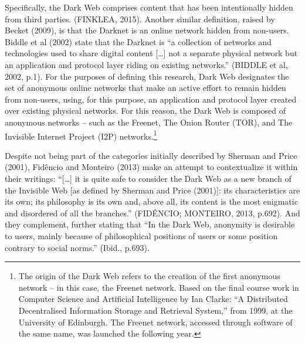 Specifically, the Dark Web comprises content that has been intentionally hidden from third parties. (FINKLEA, 2015). Another similar definition, raised by Becket (2009), is that the Darknet is an online network hidden from non-users. Biddle et al (2002) state that the Darknet is ``a collection of networks and technologies used to share digital content {[}\ldots{]} not a separate physical network but an application and protocol layer riding on existing networks.'' (BIDDLE et al, 2002, p.1). For the purposes of defining this research, Dark Web designates the set of anonymous online networks that make an active effort to remain hidden from non-users, using, for this purpose, an application and protocol layer created over existing physical networks. For this reason, the Dark Web is composed of anonymous networks -- such as the Freenet, The Onion Router (TOR), and The Invisible Internet Project (I2P) networks.\footnote{The origin of the Dark Web refers to the creation of the first anonymous network -- in this case, the Freenet network. Based on the final course work in Computer Science and Artificial Intelligence by Ian Clarke: ``A Distributed Decentralised Information Storage and Retrieval System,'' from 1999, at the University of Edinburgh. The Freenet network, accessed through software of the same name, was launched the following year.}

Despite not being part of the categories initially described by Sherman and Price (2001), Fid\^{e}ncio and Monteiro (2013) make an attempt to contextualize it within their writings: ``{[}\ldots{]} it is quite safe to consider the Dark Web as a new branch of the Invisible Web {[}as defined by Sherman and Price (2001){]}: its characteristics are its own; its philosophy is its own and, above all, its content is the most enigmatic and disordered of all the branches.'' (FID\^{E}NCIO; MONTEIRO, 2013, p.692). And they complement, further stating that ``In the Dark Web, anonymity is desirable to users, mainly because of philosophical positions of users or some position contrary to social norms.'' (Ibid., p.693).

